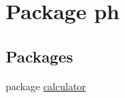 \hypertarget{namespaceph}{}\section{Package ph}
\label{namespaceph}
\subsection*{Packages}
\begin{DoxyCompactItemize}
\item 
package \mbox{\hyperlink{namespaceph_1_1calculator}{calculator}}
\end{DoxyCompactItemize}
